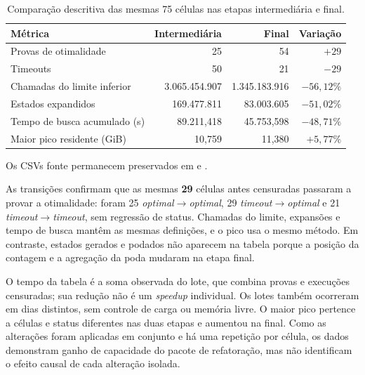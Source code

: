 \documentclass[12pt]{article}
\begin{document}
\begin{table}[H]
  \centering
  \caption{Comparação descritiva das mesmas 75 células nas etapas intermediária e final.}
  \label{tab:intermediate-final}
  \footnotesize
  \begin{tabular}{lrrr}
    \hline
    Métrica & Intermediária & Final & Variação \\
    \hline
    Provas de otimalidade             & 25 & 54 & \textbf{$+29$} \\
    Timeouts                           & 50 & 21 & \textbf{$-29$} \\
    Chamadas do limite inferior        & 3.065.454.907 & 1.345.183.916 & $-56,12\%$ \\
    Estados expandidos                 & 169.477.811 & 83.003.605 & $-51,02\%$ \\
    Tempo de busca acumulado (s)       & 89.211,418 & 45.753,598 & $-48,71\%$ \\
    Maior pico residente (GiB)         & 10,759 & 11,380 & $+5,77\%$ \\
    \hline
  \end{tabular}
\end{table}

{\footnotesize\raggedright Os CSVs fonte permanecem preservados em
 e
.\par}

As transições confirmam que as mesmas \textbf{29} células antes censuradas
passaram a provar a otimalidade: foram 25
\textit{optimal}$\rightarrow$\textit{optimal}, 29
\textit{timeout}$\rightarrow$\textit{optimal} e 21
\textit{timeout}$\rightarrow$\textit{timeout}, sem regressão de status.
Chamadas do limite, expansões e tempo de busca mantêm as mesmas definições, e o
pico usa o mesmo método. Em contraste, estados gerados e podados não aparecem
na tabela porque a posição da contagem e a agregação da poda mudaram na etapa
final.

O tempo da tabela é a soma observada do lote, que combina provas e execuções
censuradas; sua redução não é um \textit{speedup} individual. Os lotes também
ocorreram em dias distintos, sem controle de carga ou memória livre. O maior
pico pertence a células e status diferentes nas duas etapas e aumentou na final.
Como as alterações foram aplicadas em conjunto e há uma repetição por célula,
os dados demonstram ganho de capacidade do pacote de refatoração, mas não
identificam o efeito causal de cada alteração isolada.
\end{document}
